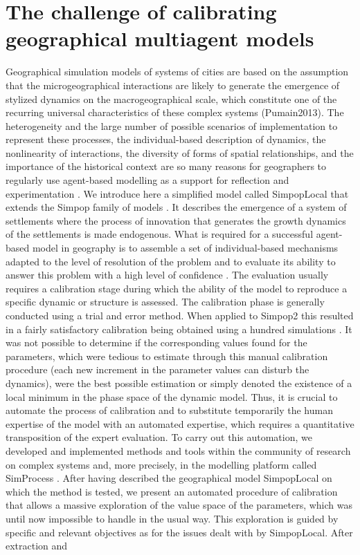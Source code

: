 \section{The challenge of calibrating geographical multiagent models}
\label{sec:challenge}

Geographical simulation models of systems of cities are based on the assumption that the microgeographical interactions are likely to generate the emergence of stylized dynamics on the macrogeographical scale, which constitute one of the recurring universal characteristics of these complex systems (Pumain2013). The heterogeneity and the large number of possible scenarios of implementation to represent these processes, the individual-based description of dynamics, the nonlinearity of interactions, the diversity of forms of spatial relationships, and the importance of the historical context are so many reasons for geographers to regularly use agent-based modelling as a support for reflection and experimentation \autocites{Batty2008, Crooks2008, Heppenstall2011, Sanders2007}. We introduce here a simplified model called SimpopLocal \autocites{Rey-Coyrehourcq2015,Schmitt2014} that extends the Simpop family of models \autocites{Pumain2011,Pumain2009}. It describes the emergence of a system of settlements where the process of innovation that generates the growth dynamics of the settlements is made endogenous. What is required for a successful agent-based model in geography is to assemble a set of individual-based mechanisms adapted to the level of resolution of the problem and to evaluate its ability to answer this problem with a high level of confidence \autocite{Sargent2005}. The evaluation usually requires a calibration stage \autocite{Balci1998} during which the ability of the model to reproduce a specific dynamic or structure is assessed. The calibration phase is generally conducted using a trial and error method. When applied to Simpop2 this resulted in a fairly satisfactory calibration being obtained using a hundred simulations \autocite{Bretagnolle2010}. It was not possible to determine if the corresponding values found for the parameters, which were tedious to estimate through this manual calibration procedure (each new increment in the parameter values can disturb the dynamics), were the best possible estimation or simply denoted the existence of a local minimum in the phase space of the dynamic model. Thus, it is crucial to automate the process of calibration and to substitute temporarily the human expertise of the model with an automated expertise, which requires a quantitative transposition of the expert evaluation. To carry out this automation, we developed and implemented methods and tools within the community of research on complex systems \autocite{Bourgine2009} and, more precisely, in the modelling platform called SimProcess \autocite{Rey-Coyrehourcq2015}. After having described the geographical model SimpopLocal on which the method is tested, we present an automated procedure of calibration that allows a massive exploration of the value space of the parameters, which was until now impossible to handle in the usual way. This exploration is guided by specific and relevant objectives as for the issues dealt with by SimpopLocal. After extraction and 